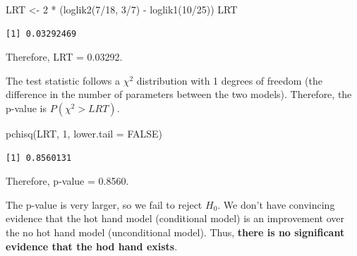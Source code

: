 \documentclass[
  letterpaper,
  DIV=11,
  numbers=noendperiod]{scrartcl}
\newenvironment{Shaded}{\begin{snugshade}}{\end{snugshade}}
\newcommand{\AttributeTok}[1]{\textcolor[rgb]{0.40,0.45,0.13}{#1}}
\newcommand{\ConstantTok}[1]{\textcolor[rgb]{0.56,0.35,0.01}{#1}}
\newcommand{\DecValTok}[1]{\textcolor[rgb]{0.68,0.00,0.00}{#1}}
\newcommand{\FunctionTok}[1]{\textcolor[rgb]{0.28,0.35,0.67}{#1}}
\newcommand{\NormalTok}[1]{\textcolor[rgb]{0.00,0.23,0.31}{#1}}
\newcommand{\OtherTok}[1]{\textcolor[rgb]{0.00,0.23,0.31}{#1}}
\newcommand{\SpecialCharTok}[1]{\textcolor[rgb]{0.37,0.37,0.37}{#1}}
\begin{document}
\begin{Shaded}
\begin{Highlighting}[]
\NormalTok{LRT }\OtherTok{\textless{}{-}} \DecValTok{2} \SpecialCharTok{*}\NormalTok{ (}\FunctionTok{loglik2}\NormalTok{(}\DecValTok{7}\SpecialCharTok{/}\DecValTok{18}\NormalTok{, }\DecValTok{3}\SpecialCharTok{/}\DecValTok{7}\NormalTok{) }\SpecialCharTok{{-}} \FunctionTok{loglik1}\NormalTok{(}\DecValTok{10}\SpecialCharTok{/}\DecValTok{25}\NormalTok{))}
\NormalTok{LRT}
\end{Highlighting}
\end{Shaded}

\begin{verbatim}
[1] 0.03292469
\end{verbatim}

Therefore, LRT = 0.03292.

The test statistic follows a \(\chi^2\) distribution with 1 degrees of
freedom (the difference in the number of parameters between the two
models). Therefore, the p-value is \(P(\chi^2>LRT)\).

\begin{Shaded}
\begin{Highlighting}[]
\FunctionTok{pchisq}\NormalTok{(LRT, }\DecValTok{1}\NormalTok{, }\AttributeTok{lower.tail =} \ConstantTok{FALSE}\NormalTok{)}
\end{Highlighting}
\end{Shaded}

\begin{verbatim}
[1] 0.8560131
\end{verbatim}

Therefore, p-value = 0.8560.

The p-value is very larger, so we fail to reject \(H_0\). We don't have
convincing evidence that the hot hand model (conditional model) is an
improvement over the no hot hand model (unconditional model). Thus,
\textbf{there is no significant evidence that the hod hand exists}.
\end{document}

